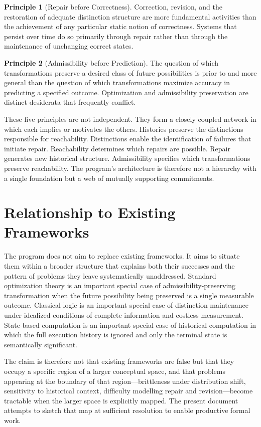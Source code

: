 \documentclass[11pt, oneside]{book}
\theoremstyle{definition}
\newtheorem{principle}{Principle}[chapter]
\theoremstyle{remark}
\begin{document}
\begin{principle}[Repair before Correctness]
Correction, revision, and the restoration of adequate distinction structure are more fundamental activities than the achievement of any particular static notion of correctness. Systems that persist over time do so primarily through repair rather than through the maintenance of unchanging correct states.
\end{principle}

\begin{principle}[Admissibility before Prediction]
The question of which transformations preserve a desired class of future possibilities is prior to and more general than the question of which transformations maximize accuracy in predicting a specified outcome. Optimization and admissibility preservation are distinct desiderata that frequently conflict.
\end{principle}

These five principles are not independent. They form a closely coupled network in which each implies or motivates the others. Histories preserve the distinctions responsible for reachability. Distinctions enable the identification of failures that initiate repair. Reachability determines which repairs are possible. Repair generates new historical structure. Admissibility specifies which transformations preserve reachability. The program's architecture is therefore not a hierarchy with a single foundation but a web of mutually supporting commitments.

\section{Relationship to Existing Frameworks}

The program does not aim to replace existing frameworks. It aims to situate them within a broader structure that explains both their successes and the pattern of problems they leave systematically unaddressed. Standard optimization theory is an important special case of admissibility-preserving transformation when the future possibility being preserved is a single measurable outcome. Classical logic is an important special case of distinction maintenance under idealized conditions of complete information and costless measurement. State-based computation is an important special case of historical computation in which the full execution history is ignored and only the terminal state is semantically significant.

The claim is therefore not that existing frameworks are false but that they occupy a specific region of a larger conceptual space, and that problems appearing at the boundary of that region—brittleness under distribution shift, sensitivity to historical context, difficulty modelling repair and revision—become tractable when the larger space is explicitly mapped. The present document attempts to sketch that map at sufficient resolution to enable productive formal work.
\end{document}
